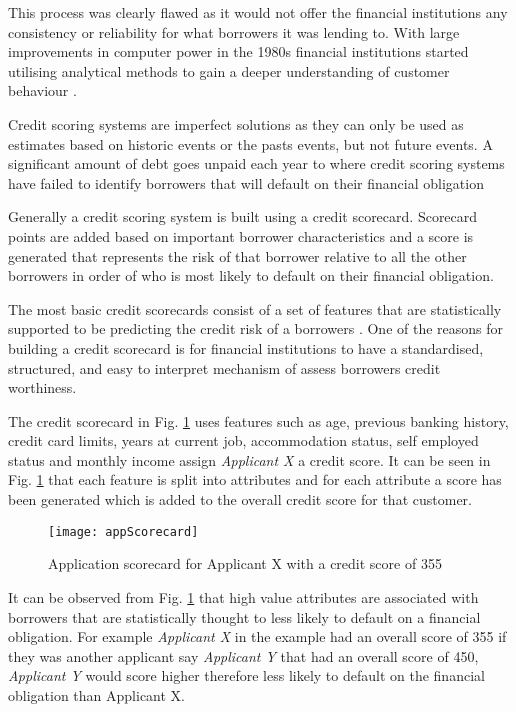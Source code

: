 This process was clearly flawed as it would not offer the financial institutions any consistency or reliability for what borrowers it was lending to. With large improvements in computer power in the 1980s financial institutions started utilising analytical methods to gain a deeper understanding of customer behaviour \citep{hand_modelling_2001}.

Credit scoring systems are imperfect solutions as they can only be used as estimates based on historic events or the pasts events, but not future events. A significant amount of debt goes unpaid each year to where credit scoring systems have failed to identify borrowers that will default on their financial obligation \citep{finlay_multiple_2011}

Generally a credit scoring system is built using a credit scorecard. Scorecard points are added based on important borrower characteristics and a score is generated that represents the risk of that borrower relative to all the other borrowers in order of who is most likely to default on their financial obligation.

The most basic credit scorecards consist of a set of features that are statistically supported to be predicting the credit risk of a borrowers \citep{siddiqi_credit_2012}. One of the reasons for building a credit scorecard is for financial institutions to have a standardised, structured, and easy to interpret mechanism of assess borrowers credit worthiness.
 
The credit scorecard in Fig. \ref{fig:appScorecard} uses features such as age, previous banking history, credit card limits, years at current job, accommodation status, self employed status and monthly income assign \textit{Applicant X} a credit score. It can be seen in Fig. \ref{fig:appScorecard} that each feature is split into attributes and for each attribute a score has been generated which is added to the overall credit score for that customer. 

\begin{figure}[H]
	\texttt{[image: appScorecard]}
	\caption{Application scorecard for Applicant X with a credit score of 355	
	}
	\label{fig:appScorecard}
\end{figure}

It can be observed from Fig. \ref{fig:appScorecard} that high value attributes are associated with borrowers that are statistically thought to less likely to default on a financial obligation. For example \textit{Applicant X} in the example had an overall score of 355 if they was another applicant say \textit{Applicant Y} that had an overall score of 450, \textit{Applicant Y} would score higher therefore less likely to default on the financial obligation than {Applicant X}.

